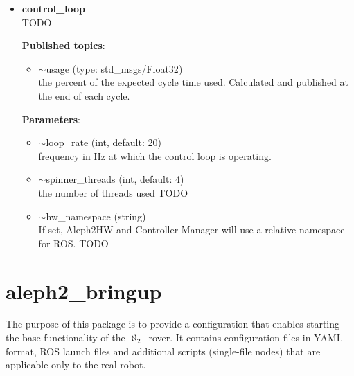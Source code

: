 \documentclass[english,inz,shortabstract]{iithesis}
\newcommand{\val}[1]{\textbf{\textsf{#1}}}
\newcommand{\rovername}{$\aleph_2$\ }
\begin{document}
	\begin{itemize}
		\item \val{control\_loop}\\
		TODO

		\textbf{Published topics}:
		\begin{itemize}[itemsep=0pt, parsep=2pt, topsep=0pt]
			\item \textsf{$\sim$usage} (type: \textsf{std\_msgs/Float32})\\
			the percent of the expected cycle time used. Calculated and published at the end of each cycle.
		\end{itemize}

		\textbf{Parameters}:
		\begin{itemize}[itemsep=0pt, parsep=2pt, topsep=0pt]
			\item \textsf{$\sim$loop\_rate} (\textsf{int}, default: \textsf{20})\\
			frequency in Hz at which the control loop is operating.
			\item \textsf{$\sim$spinner\_threads} (\textsf{int}, default: \textsf{4})\\
			the number of threads used TODO
			\item \textsf{$\sim$hw\_namespace} (\textsf{string})\\
			If set, Aleph2HW and Controller Manager will use a relative namespace for ROS. TODO
		\end{itemize}
	\end{itemize}

\section{aleph2\_bringup}
The purpose of this package is to provide a configuration that enables starting the base functionality of the \rovername rover. It contains configuration files in YAML format, ROS launch files and additional scripts (single-file nodes) that are applicable only to the real robot.
\end{document}
